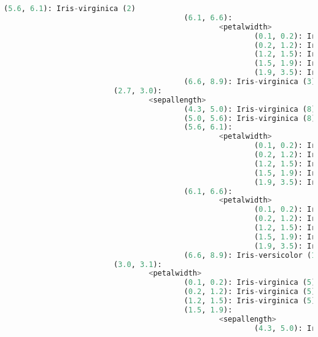 \documentclass{article}
\begin{document}
\begin{lstlisting}[language = Python]
                                         (5.6, 6.1): Iris-virginica (2)
                                         (6.1, 6.6):
                                                 <petalwidth>
                                                         (0.1, 0.2): Iris-versicolor (1)
                                                         (0.2, 1.2): Iris-versicolor (1)
                                                         (1.2, 1.5): Iris-versicolor (1)
                                                         (1.5, 1.9): Iris-versicolor (1)
                                                         (1.9, 3.5): Iris-virginica (1)
                                         (6.6, 8.9): Iris-virginica (3)
                         (2.7, 3.0):
                                 <sepallength>
                                         (4.3, 5.0): Iris-virginica (8)
                                         (5.0, 5.6): Iris-virginica (8)
                                         (5.6, 6.1):
                                                 <petalwidth>
                                                         (0.1, 0.2): Iris-virginica (4)
                                                         (0.2, 1.2): Iris-virginica (4)
                                                         (1.2, 1.5): Iris-virginica (4)
                                                         (1.5, 1.9): Iris-versicolor (1)
                                                         (1.9, 3.5): Iris-virginica (4)
                                         (6.1, 6.6):
                                                 <petalwidth>
                                                         (0.1, 0.2): Iris-virginica (4)
                                                         (0.2, 1.2): Iris-virginica (4)
                                                         (1.2, 1.5): Iris-versicolor (2)
                                                         (1.5, 1.9): Iris-virginica (3)
                                                         (1.9, 3.5): Iris-virginica (1)
                                         (6.6, 8.9): Iris-versicolor (1)
                         (3.0, 3.1):
                                 <petalwidth>
                                         (0.1, 0.2): Iris-virginica (5)
                                         (0.2, 1.2): Iris-virginica (5)
                                         (1.2, 1.5): Iris-virginica (5)
                                         (1.5, 1.9):
                                                 <sepallength>
                                                         (4.3, 5.0): Iris-virginica (3)

\end{lstlisting}
\end{document}
